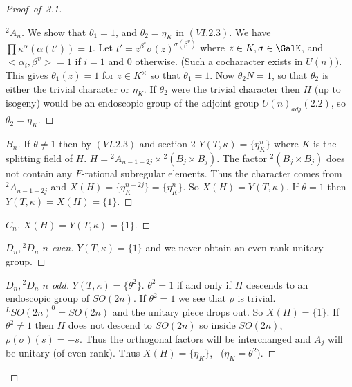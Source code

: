 \documentclass{memo-l}
\theoremstyle{definition}
\theoremstyle{remark}
\numberwithin{section}{chapter}
\numberwithin{equation}{chapter}
\begin{document}
\begin{proof}[Proof\ of\ 3.1]
\begin{proof}[${}^{2}A_{n}$]
   We show that ${\theta}_{1} = 1$, and ${\theta}_{2}  =  {\eta}_{K}$ in
$(VI.2.3)$.  We have $\prod{\kappa}^{{\alpha}}({\alpha}(t'))  =  1$.  Let $t'
 =  z^{{\beta}^{v}} {\sigma}(z)^{ {\sigma}({\beta}^{v})}$ where $z
 \in  K, {\sigma}  \in  \GalK$, and $<{\alpha}_{i},{\beta}^{v}>  =  1$ if
$i = 1$ and $0$ otherwise.  (Such a cocharacter exists in $U(n))$.  This
gives ${\theta}_{1}(z)  =  1$ for $z  \in  K^{\times}$ so that ${\theta}_{1}  =  1$.
Now ${\theta}_{2} N  =  1$, so that ${\theta}_{2}$ is either the trivial
character or ${\eta}_{K}$.  If ${\theta}_{2}$ were the trivial character
then $H$ (up to isogeny) would be an endoscopic group
of the adjoint group $U(n)_{adj} (2.2)$, so ${\theta}_{2}  =  {\eta}_{K}$.
\phantom\qedhere
\end{proof}
 

\begin{proof}[$B_{n}$] If ${\theta} \ne 1$ then by $(VI.2.3)$ and section 2 
$Y(T,{\kappa}) = \{{\eta}_{K}^{n}\}$ where $K$ is the splitting field of $H$.
$H  =  {}^{2}A_{n-1-2j} \times {}^{2}(B_{j} \times B_{j})$.  The factor
${}^{2}(B_{j} \times B_{j})$ does not contain any $F$-rational subregular
elements.  Thus the character comes from ${}^{2}A_{n-1-2j}$ and $X(H)  = 
\{{\eta}_{K}^{n-2j}\}  =  \{{\eta}_{K}^{n}\}$.  So $X(H)  =  Y(T,{\kappa})$.
If ${\theta} = 1$ then $Y(T,{\kappa}) = X(H) = \{1\}$.
\phantom\qedhere
\end{proof}
 
\begin{proof}[$C_{n}$] 
$X(H)  =  Y(T,{\kappa})  =  \{1\}$.
\phantom\qedhere
\end{proof}


\begin{proof}[$D_{n},{}^{2}D_{n}$  $n$ even]  $Y(T,{\kappa})  =  \{1\}$ and we never
obtain an even rank unitary group.  
\phantom\qedhere
\end{proof}


\begin{proof}[$D_{n},{}^{2}D_{n}$ $n$ odd]  $Y(T,{\kappa})  =  \{{\theta}^{2}\}$.
${\theta}^{2} = 1$ if and only if $H$ descends to an endoscopic group of
$SO(2n)$.  If ${\theta}^{2} = 1$ we see that ${\rho }$ is trivial.
${}^{L}SO(2n)^{0}  =  SO(2n)$ and the unitary piece drops out.  So $X(H)  = 
\{1\}$.  If ${\theta}^{2} \ne 1$ then $H$ does not descend to $SO(2n)$ so
inside $SO(2n)$, \  ${\rho }({\sigma})(s)  =  -s$.  Thus the orthogonal factors
will be interchanged and $A_{j}$ will be unitary (of even rank).  Thus
$X(H)  =  \{{\eta}_{K}\}$, \  (${\eta}_{K}  =  {\theta}^{2}$).
\phantom\qedhere
\end{proof}


\end{proof}
\end{document}
